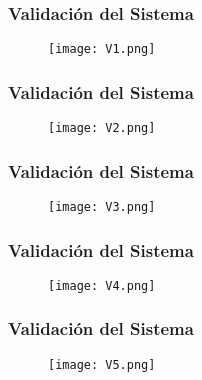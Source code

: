 
\begin{frame}
    \frametitle{Validación del Sistema}
    \begin{figure}[H]
        \centering
        \texttt{[image: V1.png]} %
        \label{fig:V1}
    \end{figure}
\end{frame}



\begin{frame}
    \frametitle{Validación del Sistema}
    \begin{figure}[H]
        \centering
        \texttt{[image: V2.png]} %
        \label{fig:V2}
    \end{figure}
\end{frame}


\begin{frame}
    \frametitle{Validación del Sistema}
    \begin{figure}[H]
        \centering
        \texttt{[image: V3.png]} %
        \label{fig:V3}
    \end{figure}
\end{frame}


\begin{frame}
    \frametitle{Validación del Sistema}
    \begin{figure}[H]
        \centering
        \texttt{[image: V4.png]} %
        \label{fig:V4}
    \end{figure}
\end{frame}


\begin{frame}
    \frametitle{Validación del Sistema}
    \begin{figure}[H]
        \centering
        \texttt{[image: V5.png]} %
        \label{fig:V5}
    \end{figure}
\end{frame}


